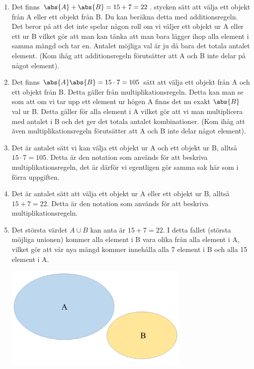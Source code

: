 \documentclass{tufte-handout}
\begin{document}
\begin{solution}
	\begin{enumerate}
		\item Det finns $\abs{A} + \abs{B} = 15 + 7 = 22$. stycken sätt att välja ett objekt från A eller ett objekt från B. Du kan beräkna detta med additionsregeln. Det beror på att det inte spelar någon roll om vi väljer ett objekt ur A eller ett ur B vilket gör att man kan tänka att man bara lägger ihop alla element i samma mängd och tar en. Antalet möjliga val är ju då bara det totala antalet element. (Kom ihåg att additionsregeln förutsätter att A och B inte delar på något element).

		\item Det finns $\abs{A}\abs{B}  = 15 \cdot 7= 105$ sätt att välja ett objekt från A och ett objekt från B. Detta gäller från multiplikationsregeln. Detta kan man se som att om vi tar upp ett element ur högen A finns det nu exakt $\abs{B}$ val ur B. Detta gäller för alla element i A vilket gör att vi man multiplicera med antalet i B och det ger det totala antalet kombinationer. (Kom ihåg att även multiplikationsregeln förutsätter att A och B inte delar något element).

		\item Det är antalet sätt vi kan välja ett objekt ur A och ett objekt ur B, alltså $15 \cdot 7=105$. Detta är den notation som används för att beskriva multiplikationsregeln, det är därför vi egentligen gör samma sak här som i förra uppgiften.

		\item Det är antalet sätt att välja ett objekt ur A eller ett objekt ur B, alltså $15 + 7 = 22$. Detta är den notation som används för att beskriva multiplikationsregeln.

		\item Det största värdet $A \cup B$ kan anta är $15+7=22$. I detta fallet (största möjliga unionen) kommer alla element i B vara olika från alla element i A, vilket gör att vår nya mängd kommer innehålla alla 7 element i B och alla 15 element i A. 
		\begin{center}
			\includegraphics[width=0.7\textwidth]{graphics/mangButanformangdA.png}
		\end{center}
		

\end{enumerate}
\end{solution}
\end{document}

